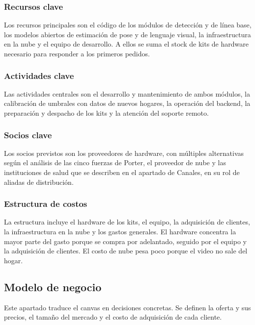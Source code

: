 \subsubsection{Recursos clave}

Los recursos principales son el código de los módulos de detección y de línea base, los modelos abiertos de estimación de pose y de lenguaje visual, la infraestructura en la nube y el equipo de desarrollo.
A ellos se suma el stock de kits de hardware necesario para responder a los primeros pedidos.

\subsubsection{Actividades clave}

Las actividades centrales son el desarrollo y mantenimiento de ambos módulos, la calibración de umbrales con datos de nuevos hogares, la operación del backend, la preparación y despacho de los kits y la atención del soporte remoto.

\subsubsection{Socios clave}

Los socios previstos son los proveedores de hardware, con múltiples alternativas según el análisis de las cinco fuerzas de Porter, el proveedor de nube y las instituciones de salud que se describen en el apartado de Canales, en su rol de aliadas de distribución.

\subsubsection{Estructura de costos}

La estructura incluye el hardware de los kits, el equipo, la adquisición de clientes, la infraestructura en la nube y los gastos generales.
El hardware concentra la mayor parte del gasto porque se compra por adelantado, seguido por el equipo y la adquisición de clientes.
El costo de nube pesa poco porque el video no sale del hogar.

\subsection{Modelo de negocio}
\label{sec:modelo}

Este apartado traduce el canvas en decisiones concretas.
Se definen la oferta y sus precios, el tamaño del mercado y el costo de adquisición de cada cliente.

